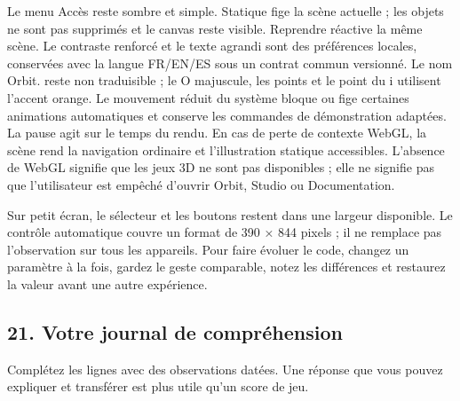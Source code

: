 \documentclass[
  canadien,
  11pt,
  letterpaper,
]{article}
\begin{document}
Le menu Accès reste sombre et simple. Statique fige la scène actuelle ;
les objets ne sont pas supprimés et le canvas reste visible. Reprendre
réactive la même scène. Le contraste renforcé et le texte agrandi sont
des préférences locales, conservées avec la langue FR/EN/ES sous un
contrat commun versionné. Le nom Orbit. reste non traduisible ; le O
majuscule, les points et le point du i utilisent l'accent orange. Le
mouvement réduit du système bloque ou fige certaines animations
automatiques et conserve les commandes de démonstration adaptées. La
pause agit sur le temps du rendu. En cas de perte de contexte WebGL, la
scène rend la navigation ordinaire et l'illustration statique
accessibles. L'absence de WebGL signifie que les jeux 3D ne sont pas
disponibles ; elle ne signifie pas que l'utilisateur est empêché
d'ouvrir Orbit, Studio ou Documentation.

Sur petit écran, le sélecteur et les boutons restent dans une largeur
disponible. Le contrôle automatique couvre un format de 390 × 844 pixels
; il ne remplace pas l'observation sur tous les appareils. Pour faire
évoluer le code, changez un paramètre à la fois, gardez le geste
comparable, notez les différences et restaurez la valeur avant une autre
expérience.

\subsection{21. Votre journal de
compréhension}\label{votre-journal-de-compruxe9hension}

Complétez les lignes avec des observations datées. Une réponse que vous
pouvez expliquer et transférer est plus utile qu'un score de jeu.
\end{document}
